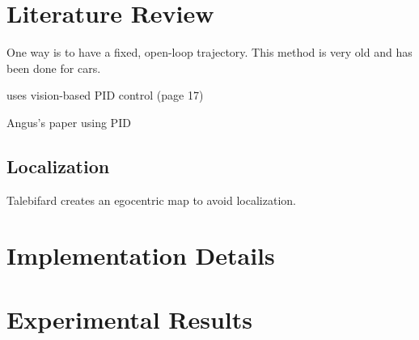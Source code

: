 \section{Literature Review}
\label{sec:backinginlitreview}
One way is to have a fixed, open-loop trajectory. This method is very old and
has been done for cars.

\cite{sermeno2006vision} uses vision-based PID control (page 17)

Angus's paper using PID

\subsection{Localization}
Talebifard \cite{talebifard2014risk} creates an egocentric map to avoid
localization.

\section{Implementation Details}

\section{Experimental Results}

% 
% 
